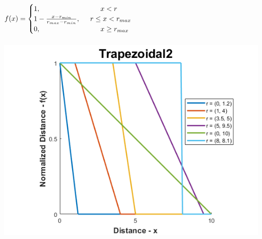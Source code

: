 \documentclass[12pt, a4paper, titlepage, openany]{book}
\begin{document}
\begin{description}[labelsep=1cm, labelwidth=2cm, nosep,style=multiline,leftmargin=3cm]
\begin{description}[labelsep=14em, labelwidth=10em, nosep,style=multiline,leftmargin=6cm]
	\item[\texttt{"trapezoidal2"}]	  $f(x) = \begin{cases} 1,  \hspace{30mm}  x<r 
	\\ 1 - \frac{x-r_{min}}{r_{max} - r_{min}},  \hspace{5mm} r\le x<r_{max} 
	\\ 0,  \hspace{30mm}  x\ge r_{max} \end{cases}$\\ \ \\
		\includegraphics[scale=.5]{FuzzTrap2v1.png} \\ 
		

\end{description}
\end{description}
\end{document}
